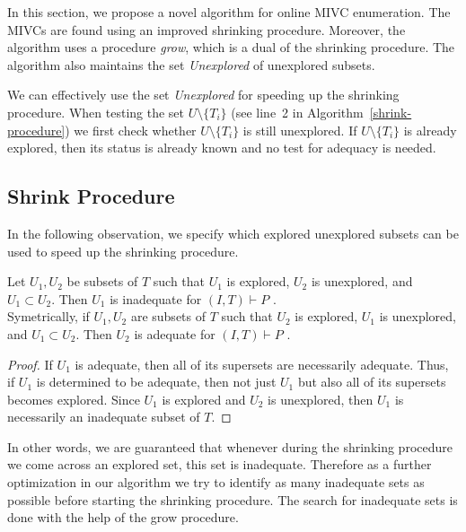 In this section, we propose a novel algorithm for online MIVC enumeration. The MIVCs are found using an improved shrinking procedure. Moreover, the algorithm uses a procedure \emph{grow}, which is a dual of the shrinking procedure. The algorithm also maintains the set \emph{Unexplored} of unexplored subsets.

We can effectively use the set  \textit{Unexplored} for speeding up the shrinking procedure. When testing the set $U \setminus \{T_i\}$ (see line~2 in Algorithm~\ref{shrink-procedure}) we first check whether  $U \setminus \{T_i\}$ is still unexplored. If $U \setminus \{T_i\}$ is already explored, then its status is already known and no test for adequacy is needed.

\subsection{Shrink Procedure}
\label{sec:shrink}

\iffalse
We can effectively use the set  \textit{Explored} for speeding up the shrinking procedure. When testing the set $U \setminus \{T_i\}$ (see line 2 in Algorithm~\ref{shrink-procedure}) we first check whether  $U \setminus \{T_i\}$ is explored. If so, the status of  $U \setminus \{T_i\}$ is known and no test for adequacy is needed.
\fi

In the following observation, we specify which explored unexplored subsets can be used to speed up the shrinking procedure.


\begin{observation}
\label{observation:explored-property}
Let $U_1, U_2$ be subsets of $T$ such that $U_1$ is explored, $U_2$ is unexplored, and $U_1 \subset U_2$. Then $U_1$ is inadequate  for $(I, T) \vdash P$ .\\
Symetrically, if $U_1, U_2$ are subsets of $T$ such that $U_2$ is explored, $U_1$ is unexplored, and $U_1 \subset U_2$. Then $U_2$ is adequate  for $(I, T) \vdash P$ .
\end{observation}

\begin{proof}
If $U_1$ is adequate, then all of its supersets are necessarily adequate. Thus, if $U_1$ is determined to be adequate, then not just $U_1$ but also all of its supersets becomes explored. Since $U_1$ is explored and $U_2$ is unexplored, then $U_1$ is necessarily an inadequate subset of $T$.
\end{proof}

In other words, we are guaranteed that whenever during the shrinking procedure we come across an explored set, this set is inadequate.
Therefore as a further optimization in our algorithm we try to identify as many inadequate sets as possible before starting the shrinking procedure.
The search for inadequate sets is done with the help  of the grow procedure.






